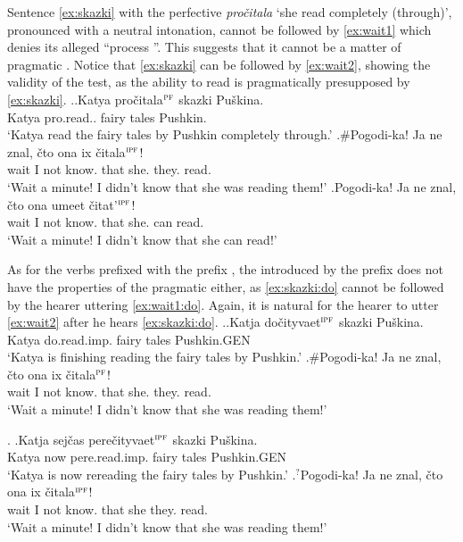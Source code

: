 Sentence \ref{ex:skazki} with the perfective  \textit{pro\v{c}itala} `she read completely (through)', pronounced with a neutral intonation, cannot be followed by \ref{ex:wait1} which denies its alleged ``process ''. This suggests that it cannot be a matter of pragmatic . Notice that \ref{ex:skazki} can be followed by \ref{ex:wait2}, showing the validity of the test, as the ability to read is pragmatically presupposed by \ref{ex:skazki}.
\ex.\ag.\label{ex:skazki}Katya pro\v{c}itala$^{\textsc{pf}}$ skazki Pu\v{s}kina.\\
Katya pro.read.. {fairy tales} Pushkin.\\
\trans `Katya read the fairy tales by Pushkin completely through.'
\bg.\#Pogodi-ka! Ja ne znal, \v{c}to ona ix \v{c}itala$^{\textsc{ipf}}$!\label{ex:wait1}\\
wait I not know. that she. they. read.\\
\trans `Wait a minute! I didn't know that she was reading them!'
\bg.\label{ex:wait2}Pogodi-ka! Ja ne znal, \v{c}to ona umeet \v{c}itat'$^{\textsc{ipf}}$!\\
wait I not know. that she. can read.\\
\trans `Wait a minute! I didn't know that she can read!'


As for the verbs prefixed with the  prefix , the  introduced by the prefix does not have the properties of the pragmatic  either, as \ref{ex:skazki:do} cannot be followed by the hearer uttering \ref{ex:wait1:do}. Again, it is natural for the hearer to utter \ref{ex:wait2} after he hears \ref{ex:skazki:do}.
\ex.\ag.\label{ex:skazki:do}Katja do\v{c}ityvaet$^{\textsc{ipf}}$ skazki Pu\v{s}kina.\\
Katya do.read.imp. {fairy tales} Pushkin.{\tiny GEN}\\
\trans `Katya is finishing reading the fairy tales by Pushkin.'
\bg.\#Pogodi-ka! Ja ne znal, \v{c}to ona ix \v{c}itala$^{\textsc{pf}}$!\label{ex:wait1:do}\\
wait I not know. that she. they. read.\\
\trans `Wait a minute! I didn't know that she was reading them!'

\ex. \label{ex:skazki:pere}\ag.\label{ex:skazki:pere1}Katja sej\v{c}as pere\v{c}ityvaet$^{\textsc{ipf}}$ skazki Pu\v{s}kina.\\
Katya now pere.read.imp. {fairy tales} Pushkin.{\tiny GEN}\\
\trans `Katya is now rereading the fairy tales by Pushkin.'
\bg.$^?$Pogodi-ka! Ja ne znal, \v{c}to ona ix \v{c}itala$^{\textsc{ipf}}$!\label{ex:wait1:pere}\\
wait I not know. that she they. read.\\
\trans `Wait a minute! I didn't know that she was reading them!'

